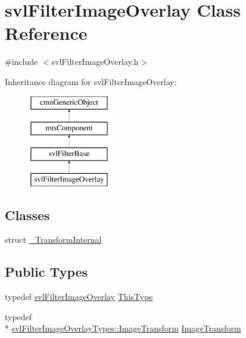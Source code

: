 \hypertarget{classsvl_filter_image_overlay}{\section{svl\-Filter\-Image\-Overlay Class Reference}
\label{classsvl_filter_image_overlay}
}


{\ttfamily \#include $<$svl\-Filter\-Image\-Overlay.\-h$>$}

Inheritance diagram for svl\-Filter\-Image\-Overlay\-:\begin{figure}[H]
\begin{center}
\leavevmode
\includegraphics[height=4.000000cm]{dc/db5/classsvl_filter_image_overlay}
\end{center}
\end{figure}
\subsection*{Classes}
\begin{DoxyCompactItemize}
\item 
struct \hyperlink{structsvl_filter_image_overlay_1_1___transform_internal}{\-\_\-\-Transform\-Internal}
\end{DoxyCompactItemize}
\subsection*{Public Types}
\begin{DoxyCompactItemize}
\item 
typedef \hyperlink{classsvl_filter_image_overlay}{svl\-Filter\-Image\-Overlay} \hyperlink{classsvl_filter_image_overlay_a9e4175de9ad9d65a5621a9fd78da6227}{This\-Type}
\item 
typedef \\*
\hyperlink{classsvl_filter_image_overlay_types_1_1_image_transform}{svl\-Filter\-Image\-Overlay\-Types\-::\-Image\-Transform} \hyperlink{classsvl_filter_image_overlay_a68354a171b2498de3aa1c5ba0ff2f002}{Image\-Transform}
\end{DoxyCompactItemize}

